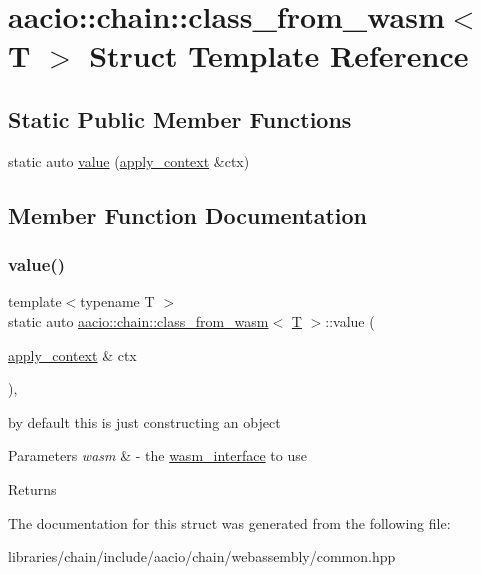 \hypertarget{structaacio_1_1chain_1_1class__from__wasm}{}\section{aacio\+:\+:chain\+:\+:class\+\_\+from\+\_\+wasm$<$ T $>$ Struct Template Reference}
\label{structaacio_1_1chain_1_1class__from__wasm}
\subsection*{Static Public Member Functions}
\begin{DoxyCompactItemize}
\item 
static auto \mbox{\hyperlink{structaacio_1_1chain_1_1class__from__wasm_a57053846d99e1daac249c92866b2cc90}{value}} (\mbox{\hyperlink{classaacio_1_1chain_1_1apply__context}{apply\+\_\+context}} \&ctx)
\end{DoxyCompactItemize}


\subsection{Member Function Documentation}
\mbox{\label{structaacio_1_1chain_1_1class__from__wasm_a57053846d99e1daac249c92866b2cc90}} 
\subsubsection{\texorpdfstring{value()}{value()}}
{\footnotesize\ttfamily template$<$typename T $>$ \\
static auto \mbox{\hyperlink{structaacio_1_1chain_1_1class__from__wasm}{aacio\+::chain\+::class\+\_\+from\+\_\+wasm}}$<$ \mbox{\hyperlink{struct_t}{T}} $>$\+::value (\begin{DoxyParamCaption}\item[{\mbox{\hyperlink{classaacio_1_1chain_1_1apply__context}{apply\+\_\+context}} \&}]{ctx }\end{DoxyParamCaption})\hspace{0.3cm}{\ttfamily [inline]}, {\ttfamily [static]}}

by default this is just constructing an object 
\begin{DoxyParams}{Parameters}
{\em wasm} & -\/ the \mbox{\hyperlink{classaacio_1_1chain_1_1wasm__interface}{wasm\+\_\+interface}} to use \\
\hline
\end{DoxyParams}
\begin{DoxyReturn}{Returns}

\end{DoxyReturn}


The documentation for this struct was generated from the following file\+:\begin{DoxyCompactItemize}
\item 
libraries/chain/include/aacio/chain/webassembly/common.\+hpp\end{DoxyCompactItemize}
